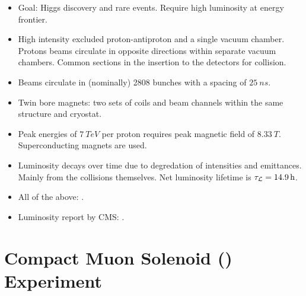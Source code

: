 \begin{itemize}
    \item Goal: Higgs discovery and rare events. Require high luminosity at
        energy frontier.
    \item High intensity excluded proton-antiproton and a single vacuum chamber.
        Protons beams circulate in opposite directions within separate vacuum
        chambers. Common sections in the insertion to the detectors for
        collision.
    \item Beams circulate in (nominally) 2808 bunches with a spacing of
        ${\SI{25}{ns}}$.
    \item Twin bore magnets: two sets of coils and beam channels within the same
        structure and cryostat.
    \item Peak energies of ${\SI{7}{TeV}}$ per proton requires peak magnetic
        field of ${\SI{8.33}{T}}$. Superconducting magnets are used.
    \item Luminosity decays over time due to degredation of intensities and
        emittances. Mainly from the collisions themselves. Net luminosity
        lifetime is ${\tau_{\mathcal{L}} = \SI{14.9}{h}}$.
    \item All of the above: \cite{Bruning:782076}.
    \item Luminosity report by CMS: \cite{CMS-PAS-LUM-17-001}.
\end{itemize}

\section{Compact Muon Solenoid (\CMS) Experiment}

